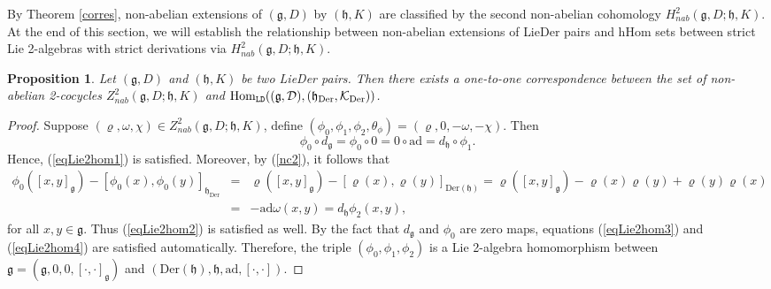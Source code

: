 \documentclass[12pt]{amsart}
\newtheorem{pro}[thm]{Proposition}
\newcommand{\g}{\mathfrak g}
\newcommand{\h}{\mathfrak h}
\newcommand{\huaD}{\mathcal{D}}
\newcommand{\huaK}{\mathcal{K}}
\newcommand{\LD}{{\rm LieDer }}
\newcommand{\Der}{\mathrm{Der}}
\newcommand{\ad}{\mathrm{ad}}
\begin{document}
By Theorem \ref{corres}, non-abelian extensions of $(\g, D)$ by $(\h, K)$ are classified by the second non-abelian cohomology $H_{nab}^2
(\g,D; \h,K)$. At the end of this section, we will establish the relationship between non-abelian extensions of \LD pairs and hHom sets between strict Lie 2-algebras with strict derivations via $H^2_{nab}(\g,D; \h,K)$.
\begin{pro}\label{2coas2homo}
Let $(\g,D)$ and $(\h,K)$ be two \LD pairs. Then there exists a one-to-one correspondence between the set of non-abelian 2-cocycles $Z^2_{nab}(\g,D;\h,K)$ and $\rm{Hom}_{\mathtt{LD}}((\g,\huaD),(\h_{\Der},\huaK_{\Der}))$.  
\end{pro}
\begin{proof}
Suppose $(\varrho,\omega,\chi)\in Z^2_{nab}(\g,D;\h,K)$, define $(\phi_{0},\phi_{1},\phi_{2},\theta_{\phi})=(\varrho,0,-\omega,-\chi)$. Then   
\begin{equation*}
\phi_{0}\circ d_{\g}=\phi_{0} \circ 0=0\circ \ad =d_{\h}\circ \phi_{1}.
\end{equation*}
Hence, (\ref{eqLie2hom1}) is satisfied. Moreover, by (\ref{nc2}), it follows that
\begin{eqnarray*}
\phi_{0}([x,y]_{\g})-[\phi_{0}(x),\phi_{0}(y)]_{\h_{\Der}}&=&\varrho([x,y]_{\g})-[\varrho(x),\varrho(y)]_{\Der(\h)}=\varrho([x,y]_{\g})-\varrho(x)\varrho(y)+\varrho(y)\varrho(x)\\
&=&-\ad \omega(x,y)=d_{\h}\phi_{2}(x,y),
\end{eqnarray*}
for all $x,y\in \g$. Thus (\ref{eqLie2hom2}) is satisfied as well. By the fact that $d_{\g}$ and $\phi_{0}$ are zero maps, equations (\ref{eqLie2hom3}) and (\ref{eqLie2hom4}) are satisfied automatically. Therefore, the triple $(\phi_{0},\phi_{1},\phi_{2})$ is a Lie 2-algebra homomorphism between $\g=(\g,0,0,[\cdot,\cdot]_{\g})$ and $(\Der(\h),\h,\ad,[\cdot,\cdot])$. 


\end{proof}
\end{document}
